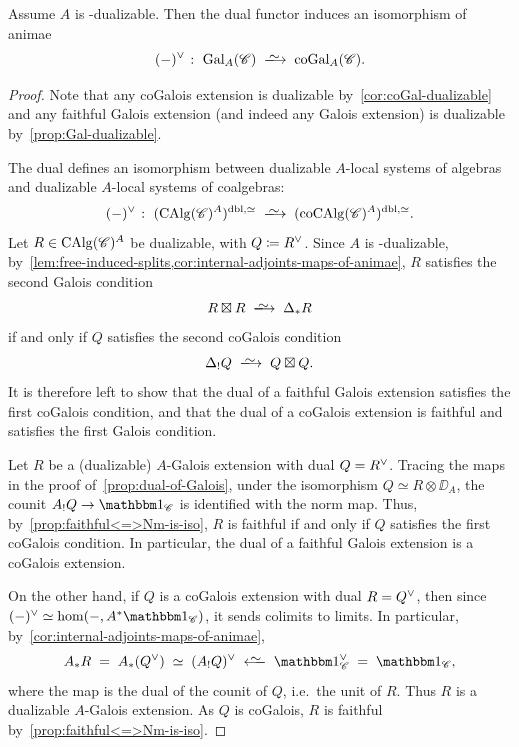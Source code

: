 \documentclass[english,svgnames,table]{article}
\begin{document}
    \begin{proposition}
    \label{prop:Gal-coGal-iso}
        Assume $A$ is \COB-dualizable. Then the dual functor induces an isomorphism of animae
        \begin{equation*}
            (-)\dual \;\colon\; \Gal_A(\cC) \;\isotoo\; \coGal_A(\cC).
        \end{equation*}
    \end{proposition}
    \begin{proof}
        Note that any coGalois extension is dualizable by~\cref{cor:coGal-dualizable} and any faithful Galois extension (and indeed any Galois extension) is dualizable by~\cref{prop:Gal-dualizable}.
        
        The dual defines an isomorphism between dualizable $A$-local systems of algebras and dualizable $A$-local systems of coalgebras:
        \begin{equation*}
            (-)\dual \;\colon\; (\CAlg(\cC)^A)^{\mrm{dbl},\simeq} \;\isotoo\; (\coCAlg(\cC)^A)^{\mrm{dbl},\simeq}.
        \end{equation*}
        Let $R\in \operatorname{CAlg}(\mathscr{C})^A$ be dualizable, with $Q \coloneq R^{\vee}$. Since $A$ is \COB-dualizable, by~\cref{lem:free-induced-splits,cor:internal-adjoints-maps-of-animae}, $R$ satisfies the second Galois condition
        \begin{equation*}
            R \boxtimes R \;\isotoo\; \Delta_* R
        \end{equation*}
        if and only if $Q$ satisfies the second coGalois condition
        \begin{equation*}
            \Delta_! Q \;\isotoo\; Q \boxtimes Q.
        \end{equation*}
        It is therefore left to show that the dual of a faithful Galois extension satisfies the first coGalois condition, and that the dual of a coGalois extension is faithful and satisfies the first Galois condition.
        
        Let $R$ be a (dualizable) $A$-Galois extension with dual $Q = R^{\vee}$. Tracing the maps in the proof of~\cref{prop:dual-of-Galois}, under the isomorphism $Q \simeq R \otimes \DD_A$, the counit $A_! Q \to \ounit_{\cC}$ is identified with the norm map. Thus, by~\cref{prop:faithful<=>Nm-is-iso}, $R$ is faithful if and only if $Q$ satisfies the first coGalois condition. In particular, the dual of a faithful Galois extension is a coGalois extension.

        On the other hand, if $Q$ is a coGalois extension with dual $R = Q^{\vee}$, then since $(-)\dual \simeq \hom(-, A^*\ounit_{\cC})$, it sends colimits to limits. In particular, by~\cref{cor:internal-adjoints-maps-of-animae},
        \begin{equation*}
            A_* R \;=\; A_* (Q\dual) \;\simeq\; (A_! Q)\dual \;\isogetss\; \ounit_{\cC}\dual \;=\; \ounit_{\cC},
        \end{equation*}
        where the map is the dual of the counit of $Q$, i.e.\ the unit of $R$. Thus $R$ is a dualizable $A$-Galois extension. As $Q$ is coGalois, $R$ is faithful by~\cref{prop:faithful<=>Nm-is-iso}.
    \end{proof}
\end{document}
